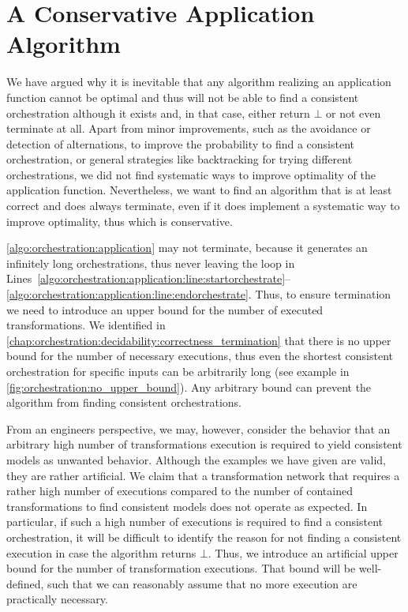 \section{A Conservative Application Algorithm}
\label{chap:orchestration:algorithm}


We have argued why it is inevitable that any algorithm realizing an application function cannot be optimal and thus will not be able to find a consistent orchestration although it exists and, in that case, either return $\bot$ or not even terminate at all.
Apart from minor improvements, such as the avoidance or detection of alternations, to improve the probability to find a consistent orchestration, or general strategies like backtracking for trying different orchestrations, we did not find systematic ways to improve optimality of the application function.
Nevertheless, we want to find an algorithm that is at least correct and does always terminate, even if it does implement a systematic way to improve optimality, thus which is conservative.

\autoref{algo:orchestration:application} may not terminate, because it generates an infinitely long orchestrations, thus never leaving the loop in Lines~\ref{algo:orchestration:application:line:startorchestrate}--\ref{algo:orchestration:application:line:endorchestrate}.
Thus, to ensure termination we need to introduce an upper bound for the number of executed transformations.
We identified in \autoref{chap:orchestration:decidability:correctness_termination} that there is no upper bound for the number of necessary executions, thus even the shortest consistent orchestration for specific inputs can be arbitrarily long (see example in \autoref{fig:orchestration:no_upper_bound}).
Any arbitrary bound can prevent the algorithm from finding consistent orchestrations.

From an engineers perspective, we may, however, consider the behavior that an arbitrary high number of transformations execution is required to yield consistent models as unwanted behavior.
Although the examples we have given are valid, they are rather artificial.
We claim that a transformation network that requires a rather high number of executions compared to the number of contained transformations to find consistent models does not operate as expected.
In particular, if such a high number of executions is required to find a consistent orchestration, it will be difficult to identify the reason for not finding a consistent execution in case the algorithm returns $\bot$.
Thus, we introduce an artificial upper bound for the number of transformation executions.
That bound will be well-defined, such that we can reasonably assume that no more execution are practically necessary.

